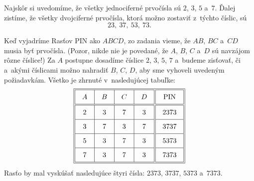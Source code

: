 {%
Najskôr si uvedomíme, že všetky jednociferné prvočísla sú $2$, $3$, $5$ a~$7$.
Ďalej zistíme, že všetky dvojciferné prvočísla, ktorá možno zostaviť
z~týchto číslic, sú
$$
23,\ 37,\ 53,\ 73.
$$

Keď vyjadríme Rasťov PIN ako $ABCD$, zo zadania vieme, že $AB$, $BC$
a~$CD$ musia byť prvočísla.
(Pozor, nikde nie je povedané, že $A$, $B$, $C$ a~$D$ sú navzájom rôzne číslice!)
Za $A$ postupne dosadíme číslice $2$, $3$, $5$, $7$ a~budeme zisťovať, či a~akými
číslicami možno nahradiť $B$, $C$, $D$, aby sme vyhoveli uvedeným požiadavkám.
Všetko je zhrnuté v~nasledujúcej tabuľke:
$$
\vbox{\bgroup\offinterlineskip
\def \vvrule{\vrule \kern 1.4pt \vrule}
\def \\{\crcr\multispan 4\vvrule\hrulefill\vvrule&\omit\hrulefill\vvrule\cr}
\def \vkern{\multispan 5\vrule  height1.2pt \hfil \vrule }
\def\strut {\vrule  height13pt depth 7pt width0pt }
\halign  {\vvrule\quad\hfil#\hfil\quad\vrule &\quad\hfil#\hfil\quad\vrule
&\quad\hfil#\hfil\quad\vrule &\quad\hfil#\hfil\quad\vvrule &\quad\hfil#\hfil\quad \vvrule\strut \cr
\noalign{\hrule} \vkern\\
$A$&$B$&$C$&$D$&PIN\\
\vkern\\
2&3&7&3&2373\\
3&7&3&7&3737\\
5&3&7&3&5373\\
7&3&7&3&7373\\
\vkern\cr\noalign{\hrule}}
\egroup}
$$
Rasťo by mal vyskúšať nasledujúce štyri čísla:
$2373$, $3737$, $5373$ a~$7373$.}

